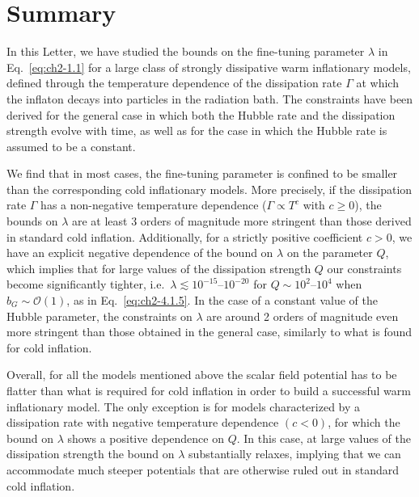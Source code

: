 \section{Summary} \label{sec:ch2-5}

In this Letter, we have studied the bounds on the fine-tuning parameter $\lambda$ in Eq.~\ref{eq:ch2-1.1} for a large class of strongly dissipative warm inflationary models, defined through the temperature dependence of the dissipation rate $\Gamma$ at which the inflaton decays into particles in the radiation bath. The constraints have been derived for the general case in which both the Hubble rate and the dissipation strength evolve with time, as well as for the case in which the Hubble rate is assumed to be a constant.

We find that in most cases, the fine-tuning parameter is confined to be smaller than the corresponding cold inflationary models. More precisely, if the dissipation rate $\Gamma$ has a non-negative temperature dependence ($\Gamma \propto T^c$ with $c\geq 0$), the bounds on $\lambda$ are at least 3 orders of magnitude more stringent than those derived in standard cold inflation. Additionally, for a strictly positive coefficient $c>0$, we have an explicit negative dependence of the bound on $\lambda$ on the parameter $Q$, which implies that for large values of the dissipation strength $Q$ our constraints become significantly tighter, i.e.\ $\lambda\lesssim 10^{-15}\text{--}10^{-20}$ for $Q\sim 10^{2}\text{--}10^{4}$ when $b_G\sim \mathcal{O}(1)$, as in Eq.~\ref{eq:ch2-4.1.5}. In the case of a constant value of the Hubble parameter, the constraints on $\lambda$ are around 2 orders of magnitude even more stringent than those obtained in the general case, similarly to what is found for cold inflation.

Overall, for all the models mentioned above the scalar field potential has to be flatter than what is required for cold inflation in order to build a successful warm inflationary model. The only exception is for models characterized by a dissipation rate with negative temperature dependence $(c<0)$, for which the bound on $\lambda$ shows a positive dependence on $Q$. In this case, at large  values of the dissipation strength the bound on $\lambda$ substantially relaxes, implying that we can accommodate much steeper potentials that are otherwise ruled out in standard cold inflation.


